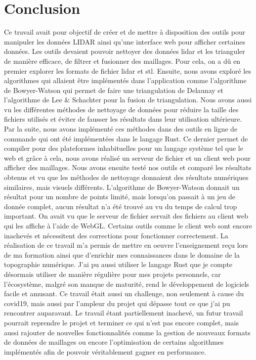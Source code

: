 \chapter*{Conclusion}

Ce travail avait pour objectif de créer et de mettre à disposition des outils pour manipuler les données LIDAR ainsi qu’une interface web pour afficher certaines données.
Les outils devaient pouvoir nettoyer des données \gls{lidar} et les trianguler de manière efficace, de filtrer et fusionner des maillages.
Pour cela, on a dû en premier explorer les formats de fichier \gls{lidar} et \gls{stl}.
Ensuite, nous avons exploré les algorithmes qui allaient être implémentés dans l’application comme l’algorithme de Bowyer-Watson qui permet de faire une triangulation de Delaunay et l’algorithme de Lee \& Schachter pour la fusion de triangulation.
Nous avons aussi vu les différentes méthodes de nettoyage de données pour réduire la taille des fichiers utilisés et éviter de fausser les résultats dans leur utilisation ultérieure.
Par la suite, nous avons implémenté ces méthodes dans des outils en ligne de commande qui ont été implémentées dans le langage Rust.
Ce dernier permet de compiler pour des plateformes inhabituelles pour un langage système tel que le web et grâce à cela, nous avons réalisé un serveur de fichier et un client web pour afficher des maillages.
Nous avons ensuite testé nos outils et comparé les résultats obtenus et vu que les méthodes de nettoyage donnaient des résultats numériques similaires, mais visuels différents.
L’algorithme de Bowyer-Watson donnait un résultat pour un nombre de points limité, mais lorsqu’on passait à un jeu de donnée complet, aucun résultat n’a été trouvé au vu du temps de calcul trop important.
On avait vu que le serveur de fichier servait des fichiers au client web qui les affiche à l’aide de WebGL.
Certains outils comme le client web sont encore inachevés et nécessitent des corrections pour fonctionner correctement.
La réalisation de ce travail m’a permis de mettre en oeuvre l’enseignement reçu lors de ma formation ainsi que d’enrichir mes connaissances dans le domaine de la topographie numérique.
J’ai pu aussi utiliser le langage Rust que je compte désormais utiliser de manière régulière pour mes projets personnels, car l’écosystème, malgré son manque de maturité, rend le développement de logiciels facile et amusant.
Ce travail était aussi un challenge, non seulement à cause du covid19, mais aussi par l’ampleur du projet qui dépasse tout ce que j’ai pu rencontrer auparavant.
Le travail étant partiellement inachevé, un futur travail pourrait reprendre le projet et terminer ce qui n’est pas encore complet, 
mais aussi rajouter de nouvelles fonctionnalités comme la gestion de nouveaux formats de données de maillages ou encore l’optimisation de certains algorithmes implémentés afin de pouvoir véritablement gagner en performance.


